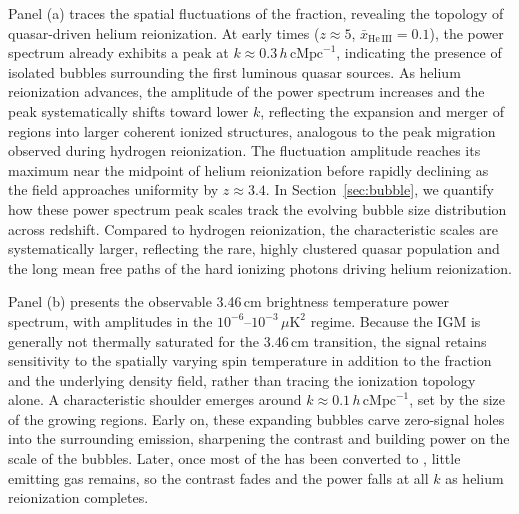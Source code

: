 \documentclass[apj,twocolumn, appendixfloats, twocolappendix, numberedappendix, tighten]{openjournal}
\begin{document}
Panel (a) traces the spatial fluctuations of the  fraction, revealing the topology of quasar-driven helium reionization. At early times ($z \approx 5$, $\bar{x}_\mathrm{He\,III} = 0.1$), the power spectrum already exhibits a peak at $k \approx 0.3\,h\,\mathrm{cMpc}^{-1}$, indicating the presence of isolated  bubbles surrounding the first luminous quasar sources. As helium reionization advances, the amplitude of the power spectrum increases and the peak systematically shifts toward lower $k$, reflecting the expansion and merger of  regions into larger coherent ionized structures, analogous to the peak migration observed during hydrogen reionization. The fluctuation amplitude reaches its maximum near the midpoint of helium reionization before rapidly declining as the  field approaches uniformity by $z \approx 3.4$. In Section~\ref{sec:bubble}, we quantify how these power spectrum peak scales track the evolving  bubble size distribution across redshift. Compared to hydrogen reionization, the characteristic scales are systematically larger, reflecting the rare, highly clustered quasar population and the long mean free paths of the hard ionizing photons driving helium reionization.

Panel (b) presents the observable 3.46\,cm brightness temperature power spectrum, with amplitudes in the $10^{-6}\text{--}10^{-3}\, \mu\mathrm{K}^2$ regime. Because the IGM is generally not thermally saturated for the 3.46\,cm transition, the signal retains sensitivity to the spatially varying spin temperature in addition to the  fraction and the underlying density field, rather than tracing the ionization topology alone. A characteristic shoulder emerges around $k \approx 0.1\,h\,\mathrm{cMpc}^{-1}$, set by the size of the growing  regions. Early on, these expanding  bubbles carve zero-signal holes into the surrounding  emission, sharpening the contrast and building power on the scale of the bubbles. Later, once most of the  has been converted to , little emitting gas remains, so the contrast fades and the power falls at all $k$ as helium reionization completes.
\end{document}
